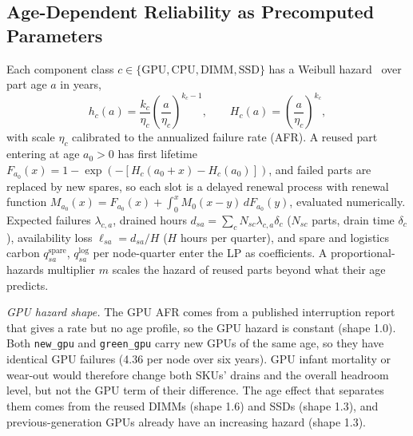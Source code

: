 \documentclass{article} %
\begin{document}
\subsection{Age-Dependent Reliability as Precomputed Parameters}
\label{sec:method_rel}
Each component class $c \in \{\text{GPU}, \text{CPU}, \text{DIMM}, \text{SSD}\}$ has a Weibull hazard~\citep{Weibull1951StatisticalDistribution} over part age $a$ in years,
\begin{equation}
h_c(a) = \frac{k_c}{\eta_c}\left(\frac{a}{\eta_c}\right)^{k_c-1}, \qquad H_c(a) = \left(\frac{a}{\eta_c}\right)^{k_c},
\label{eq:weibull}
\end{equation}
with scale $\eta_c$ calibrated to the annualized failure rate (AFR). A reused part entering at age $a_0>0$ has first lifetime $F_{a_0}(x) = 1 - \exp(-[H_c(a_0+x) - H_c(a_0)])$, and failed parts are replaced by new spares, so each slot is a delayed renewal process with renewal function $M_{a_0}(x) = F_{a_0}(x) + \int_0^x M_0(x-y)\,dF_{a_0}(y)$, evaluated numerically. Expected failures $\lambda_{c,a}$, drained hours $d_{sa} = \sum_c N_{sc}\lambda_{c,a}\delta_c$ ($N_{sc}$ parts, drain time $\delta_c$), availability loss $\ell_{sa} = d_{sa}/H$ ($H$ hours per quarter), and spare and logistics carbon $q^{\text{spare}}_{sa}$, $q^{\text{log}}_{sa}$ per node-quarter enter the LP as coefficients. A proportional-hazards multiplier $m$ scales the hazard of reused parts beyond what their age predicts.

\emph{GPU hazard shape.} The GPU AFR comes from a published interruption report that gives a rate but no age profile, so the GPU hazard is constant (shape 1.0). Both \texttt{new\_gpu} and \texttt{green\_gpu} carry new GPUs of the same age, so they have identical GPU failures (4.36 per node over six years). GPU infant mortality or wear-out would therefore change both SKUs' drains and the overall headroom level, but not the GPU term of their difference. The age effect that separates them comes from the reused DIMMs (shape 1.6) and SSDs (shape 1.3), and previous-generation GPUs already have an increasing hazard (shape 1.3).
\end{document}

